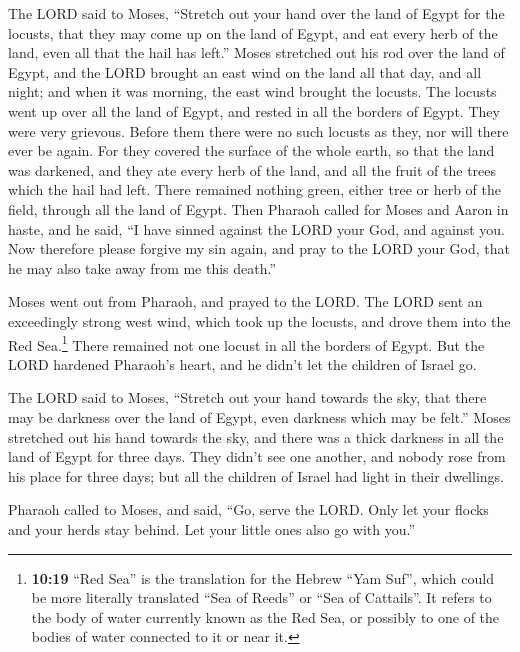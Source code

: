  The LORD said to Moses, ``Stretch out your hand over the
land of Egypt for the locusts, that they may come up on the land of
Egypt, and eat every herb of the land, even all that the hail has
left.''  Moses stretched out his rod over the land of
Egypt, and the LORD brought an east wind on the land all that day, and
all night; and when it was morning, the east wind brought the locusts.
 The locusts went up over all the land of Egypt, and
rested in all the borders of Egypt. They were very grievous. Before them
there were no such locusts as they, nor will there ever be again.
 For they covered the surface of the whole earth, so that
the land was darkened, and they ate every herb of the land, and all the
fruit of the trees which the hail had left. There remained nothing
green, either tree or herb of the field, through all the land of Egypt.
 Then Pharaoh called for Moses and Aaron in haste, and he
said, ``I have sinned against the LORD your God, and against you.
 Now therefore please forgive my sin again, and pray to
the LORD your God, that he may also take away from me this death.''

 Moses went out from Pharaoh, and prayed to the LORD.
 The LORD sent an exceedingly strong west wind, which
took up the locusts, and drove them into the Red Sea.\footnote{\textbf{10:19}
  ``Red Sea'' is the translation for the Hebrew ``Yam Suf'', which could
  be more literally translated ``Sea of Reeds'' or ``Sea of Cattails''.
  It refers to the body of water currently known as the Red Sea, or
  possibly to one of the bodies of water connected to it or near it.}
There remained not one locust in all the borders of Egypt.
 But the LORD hardened Pharaoh's heart, and he didn't let
the children of Israel go.

 The LORD said to Moses, ``Stretch out your hand towards
the sky, that there may be darkness over the land of Egypt, even
darkness which may be felt.''  Moses stretched out his
hand towards the sky, and there was a thick darkness in all the land of
Egypt for three days.  They didn't see one another, and
nobody rose from his place for three days; but all the children of
Israel had light in their dwellings.

 Pharaoh called to Moses, and said, ``Go, serve the LORD.
Only let your flocks and your herds stay behind. Let your little ones
also go with you.''

